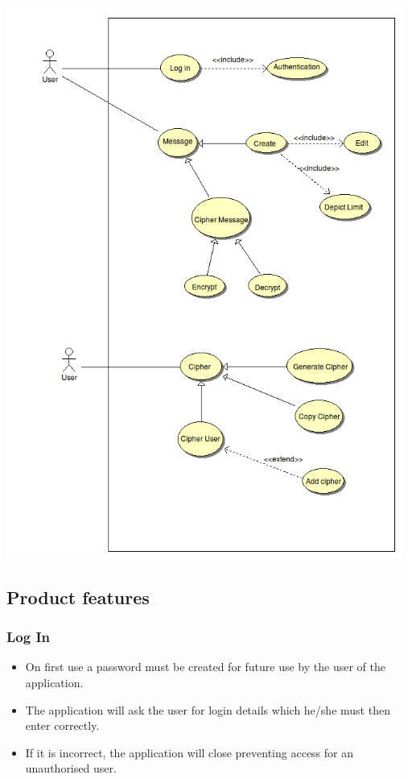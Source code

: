 \begin{center}
 \includegraphics[width=13cm]{diagrams/UseCaseDiagrams/UseCaseSMSEncryption.png}
\end{center}




\subsection{Product features}
\subsubsection{Log In}
\begin{itemize}
\item On first use a password must be created for future use by the user of the application.
\item The application will ask the user for login details which he/she must then enter correctly. 
\item If it is incorrect, the application will close preventing access for an unauthorised user.
\end{itemize}
